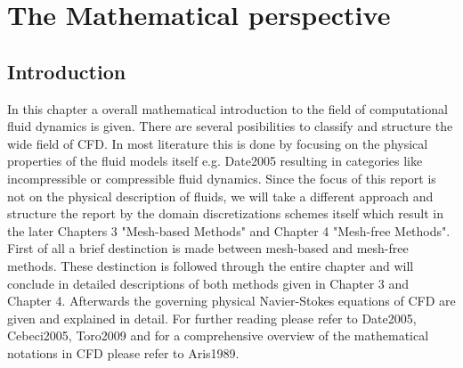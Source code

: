 %
%
%


\chapter{The Mathematical perspective} %

\label{Chapter3} %



\section{Introduction}

In this chapter a overall mathematical introduction to the field of computational fluid dynamics is given. There are several
posibilities to classify and structure the wide field of CFD. In most literature this is done by focusing on the physical properties
of the fluid models itself e.g. Date2005 resulting in categories like incompressible or compressible fluid dynamics. Since the focus of this
report is not on the physical description of fluids, we will take a different approach and structure the report by the domain discretizations
schemes itself which result in the later Chapters 3 "Mesh-based Methods" and Chapter 4 "Mesh-free Methods". First of all a
brief destinction is made between mesh-based and mesh-free methods. These destinction is followed through the entire chapter
and will conclude in detailed descriptions of both methods given in Chapter 3 and Chapter 4. Afterwards the governing physical Navier-Stokes
equations of CFD are given and explained in detail.
For further reading please refer to Date2005, Cebeci2005, Toro2009 and for a comprehensive overview of the mathematical notations in CFD please refer to Aris1989.

